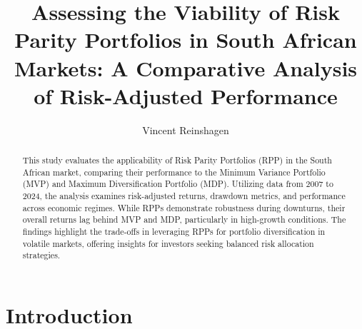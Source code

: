 \documentclass[11pt,preprint]{elsarticle}
\numberwithin{equation}{section}
\numberwithin{figure}{section}
\numberwithin{table}{section}
\begin{document}
\begin{frontmatter}  %

\title{Assessing the Viability of Risk Parity Portfolios in South
African Markets: A Comparative Analysis of Risk-Adjusted Performance}





\author[Add1]{Vincent Reinshagen}





\address[Add1]{Stellenbosch University, Stellenbosch, South Africa}


\begin{abstract}
\small{
This study evaluates the applicability of Risk Parity Portfolios (RPP)
in the South African market, comparing their performance to the Minimum
Variance Portfolio (MVP) and Maximum Diversification Portfolio (MDP).
Utilizing data from 2007 to 2024, the analysis examines risk-adjusted
returns, drawdown metrics, and performance across economic regimes.
While RPPs demonstrate robustness during downturns, their overall
returns lag behind MVP and MDP, particularly in high-growth conditions.
The findings highlight the trade-offs in leveraging RPPs for portfolio
diversification in volatile markets, offering insights for investors
seeking balanced risk allocation strategies.
}
\end{abstract}

\vspace{1cm}





\vspace{0.5cm}

\end{frontmatter}

\setcounter{footnote}{0}



\pagestyle{fancy}
\chead{}
\rhead{}
\lfoot{}
\lhead{}
\cfoot{}


\headsep 35pt %




\section{\texorpdfstring{Introduction
\label{Introduction}}{Introduction }}\label{introduction}
\end{document}
